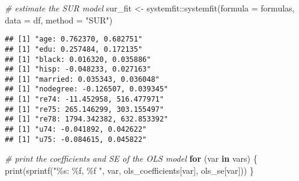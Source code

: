 \documentclass[
]{article}
\newenvironment{Shaded}{\begin{snugshade}}{\end{snugshade}}
\newcommand{\AttributeTok}[1]{\textcolor[rgb]{0.77,0.63,0.00}{#1}}
\newcommand{\CommentTok}[1]{\textcolor[rgb]{0.56,0.35,0.01}{\textit{#1}}}
\newcommand{\ControlFlowTok}[1]{\textcolor[rgb]{0.13,0.29,0.53}{\textbf{#1}}}
\newcommand{\DecValTok}[1]{\textcolor[rgb]{0.00,0.00,0.81}{#1}}
\newcommand{\FunctionTok}[1]{\textcolor[rgb]{0.00,0.00,0.00}{#1}}
\newcommand{\NormalTok}[1]{#1}
\newcommand{\OtherTok}[1]{\textcolor[rgb]{0.56,0.35,0.01}{#1}}
\newcommand{\SpecialCharTok}[1]{\textcolor[rgb]{0.00,0.00,0.00}{#1}}
\newcommand{\StringTok}[1]{\textcolor[rgb]{0.31,0.60,0.02}{#1}}
\begin{document}
\begin{Shaded}
\begin{Highlighting}[]
\CommentTok{\# estimate the SUR model}
\NormalTok{sur\_fit }\OtherTok{\textless{}{-}}\NormalTok{ systemfit}\SpecialCharTok{::}\FunctionTok{systemfit}\NormalTok{(}\AttributeTok{formula =}\NormalTok{ formulas, }\AttributeTok{data =}\NormalTok{ df, }\AttributeTok{method =} \StringTok{"SUR"}\NormalTok{)}
\end{Highlighting}
\end{Shaded}

\begin{Shaded}
\end{Shaded}

\begin{verbatim}
## [1] "age: 0.762370, 0.682751"
## [1] "edu: 0.257484, 0.172135"
## [1] "black: 0.016320, 0.035886"
## [1] "hisp: -0.048233, 0.027163"
## [1] "married: 0.035343, 0.036048"
## [1] "nodegree: -0.126507, 0.039345"
## [1] "re74: -11.452958, 516.477971"
## [1] "re75: 265.146299, 303.155497"
## [1] "re78: 1794.342382, 632.853392"
## [1] "u74: -0.041892, 0.042622"
## [1] "u75: -0.084615, 0.045822"
\end{verbatim}

\begin{Shaded}
\begin{Highlighting}[]
\CommentTok{\# print the coefficients and SE of the OLS model}
\ControlFlowTok{for}\NormalTok{ (var }\ControlFlowTok{in}\NormalTok{ vars)}
\NormalTok{\{}
  \FunctionTok{print}\NormalTok{(}\FunctionTok{sprintf}\NormalTok{(}\StringTok{"\%s: \%f, \%f "}\NormalTok{, var, ols\_coefficients[var], ols\_se[var]))}
\NormalTok{\}}
\end{Highlighting}
\end{Shaded}
\end{document}
